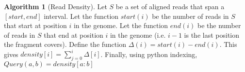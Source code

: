 
% 


\theoremstyle{definition}
\newtheorem{definition}{Algorithm}

\begin{definition}[Read Density] \label{algo1}
Let $S$ be a set of aligned reads that span a $[start,end]$ interval. Let the function $start(i)$ be the number of reads in $S$ that start at position $i$ in the genome. Let the function $end(i)$ be the number of reads in $S$ that end at position $i$ in the genome (i.e. $i-1$ is the last position the fragment covers). Define the function $\Delta(i) = start(i) - end(i)$. This gives $density[i] = \sum\limits_{j=0}^i \Delta[i]$. Finally, using python indexing, $Query(a, b) = density[a:b]$


\end{definition}

